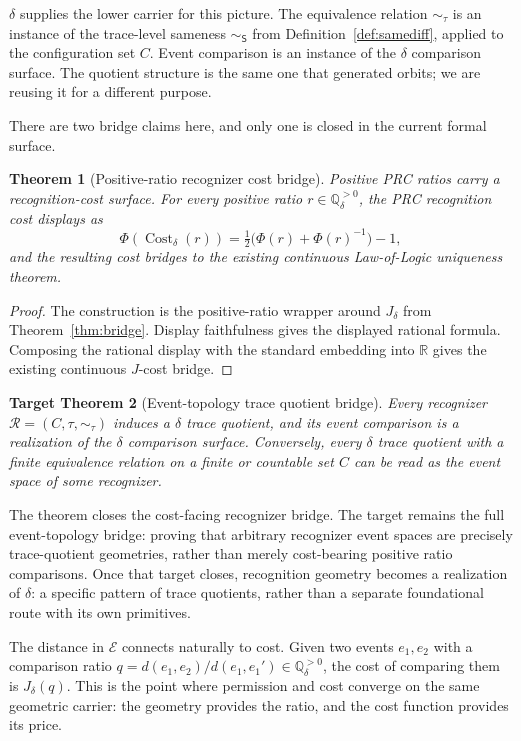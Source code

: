 \documentclass[11pt,a4paper]{article}
\newtheorem{theorem}{Theorem}[section]
\newtheorem{target}[theorem]{Target Theorem}
\theoremstyle{definition}
\theoremstyle{remark}
\begin{document}
$\delta$ supplies the lower carrier for this picture. The equivalence relation
$\sim_\tau$ is an instance of the trace-level sameness $\sim_{\mathsf{S}}$
from Definition~\ref{def:samediff}, applied to the configuration set $C$.
Event comparison is an instance of the $\delta$ comparison surface. The
quotient structure is the same one that generated orbits; we are reusing it
for a different purpose.

There are two bridge claims here, and only one is closed in the current
formal surface.

\begin{theorem}[Positive-ratio recognizer cost bridge]\label{thm:recognizer-cost}
Positive PRC ratios carry a recognition-cost surface. For every positive
ratio $r \in \mathbb{Q}_\delta^{>0}$, the PRC recognition cost displays as
\[
  \Phi(\operatorname{Cost}_\delta(r))
  =
  \tfrac{1}{2}\bigl(\Phi(r)+\Phi(r)^{-1}\bigr)-1,
\]
and the resulting cost bridges to the existing continuous Law-of-Logic
uniqueness theorem.
\end{theorem}

\begin{proof}
The construction is the positive-ratio wrapper around $J_\delta$ from
Theorem~\ref{thm:bridge}. Display faithfulness gives the displayed rational
formula. Composing the rational display with the standard embedding into
$\mathbb{R}$ gives the existing continuous $J$-cost bridge.
\end{proof}

\begin{target}[Event-topology trace quotient bridge]\label{tgt:geometry}
Every recognizer $\mathcal{R} = (C, \tau, \sim_\tau)$ induces a $\delta$
trace quotient, and its event comparison is a realization of the $\delta$
comparison surface. Conversely, every $\delta$ trace quotient with a finite
equivalence relation on a finite or countable set $C$ can be read as the
event space of some recognizer.
\end{target}

The theorem closes the cost-facing recognizer bridge. The target remains the
full event-topology bridge: proving that arbitrary recognizer event spaces are
precisely trace-quotient geometries, rather than merely cost-bearing positive
ratio comparisons. Once that target closes, recognition geometry becomes a
realization of $\delta$: a specific pattern of trace quotients, rather than a
separate foundational route with its own primitives.

The distance in $\mathcal{E}$ connects naturally to cost. Given two events
$e_1, e_2$ with a comparison ratio $q = d(e_1, e_2) / d(e_1, e_1') \in
\mathbb{Q}_\delta^{>0}$, the cost of comparing them is $J_\delta(q)$. This
is the point where permission and cost converge on the same geometric
carrier: the geometry provides the ratio, and the cost function provides its
price.
\end{document}
